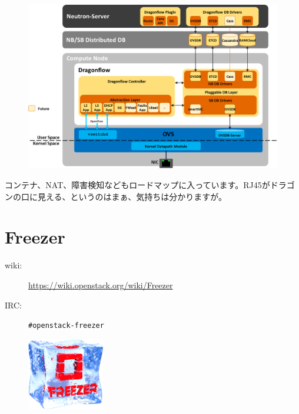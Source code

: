 \begin{figure}[htb]
	\begin{center}
		\includegraphics[width=\textwidth]{img/dragonflow_distributed_architecture.png}
	\end{center}
\end{figure}

コンテナ、NAT、障害検知などもロードマップに入っています。RJ45がドラゴンの口に見える、というのはまぁ、気持ちは分かりますが。

\section{Freezer}

\begin{description}
	\item[wiki:] \url{https://wiki.openstack.org/wiki/Freezer}
	\item[IRC:] \verb|#openstack-freezer|
\end{description}

\begin{figure}
	\begin{center}
		\includegraphics[width=0.3\textwidth]{img/freezer_logo.png}
	\end{center}
\end{figure}

